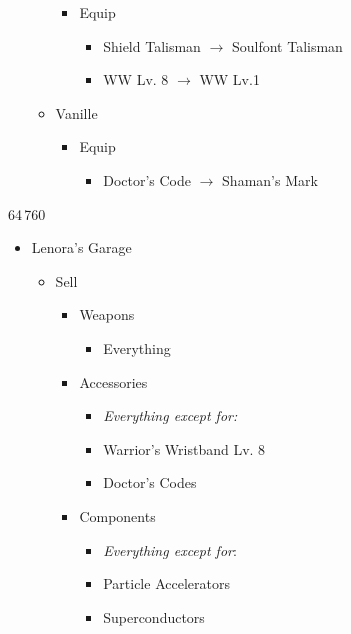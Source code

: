 \begin{multicols}{2}
\begin{menu}
\begin{itemize}
\begin{itemize}
        \begin{itemize}
            \item Equip
            \begin{itemize}
                \item Shield Talisman $\rightarrow$ Soulfont Talisman
		\item WW Lv. 8 $\rightarrow$ WW Lv.1
            \end{itemize}
        \end{itemize}
	\item Vanille
        \begin{itemize}
            \item Equip
            \begin{itemize}
                \item Doctor's Code $\rightarrow$ Shaman's Mark
            \end{itemize}
        \end{itemize}
    \end{itemize}
\end{itemize}
\end{menu}
\begin{shop}{64\,760}
\begin{itemize}
    \item Lenora's Garage
    \begin{itemize}
        \item Sell
        \begin{itemize}
            \item Weapons
            \begin{itemize}
                \item Everything
            \end{itemize}
            \item Accessories
            \begin{itemize}
            \item \textit{Everything except for:}
                \item Warrior's Wristband Lv. 8
                \item Doctor's Codes
            \end{itemize}
            \item Components
            \begin{itemize}
                \item \textit{Everything except for}:
                \item Particle Accelerators
                \item Superconductors

\end{itemize}
\end{itemize}
\end{itemize}
\end{itemize}
\end{shop}
\end{multicols}
